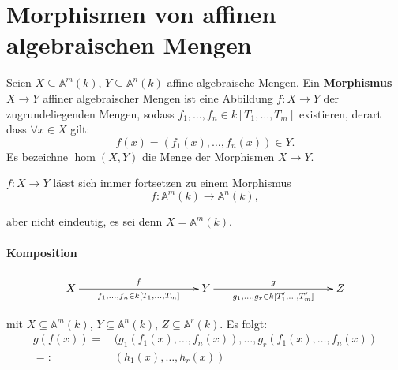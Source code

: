 
\section{Morphismen von affinen algebraischen Mengen}
\label{sec:morphismen-alg-mengen}
\begin{defn}
  \label{def:morphismus-alg-mengen}
  Seien $X\subseteq\mathbb{A}^{m}(k)$, $Y\subseteq\mathbb{A}^{n}(k)$
  affine algebraische Mengen. Ein \textbf{Morphismus} $X\rightarrow Y$
  affiner algebraischer Mengen ist eine Abbildung $f:X\rightarrow Y$
  der zugrundeliegenden Mengen, sodass $f_{1},\ldots,f_{n}\in k[T_{1},\ldots,T_{m}]$
  existieren, derart dass $\forall x\in X$ gilt:
  \[
    f(x)=(f_{1}(x),\ldots,f_{n}(x)) \in Y.
  \]
  Es bezeichne $\hom(X,Y)$ die Menge der Morphismen $X \to Y$. 
\end{defn}
\begin{rem}
  \label{rem:morphismen-fortsetzbarkeit}
  $f:X\rightarrow Y$ lässt sich immer fortsetzen zu einem Morphismus
  \[
    f:\mathbb{A}^{m}(k)\rightarrow\mathbb{A}^{n}(k),
  \]

  aber nicht eindeutig, es sei denn $X=\mathbb{A}^{m}(k)$.
\end{rem}

\paragraph{Komposition}

\[
  \xymatrix@C=9pc{X\ar[r]^{f}_{f_{1},\ldots,f_{n}\in k[T_{1},\ldots,T_{m}]} & Y\ar[r]^{g}_{g_{1},\ldots,g_{r}\in k[T_{1}',\ldots,T_{m}']} & Z}
\]

mit $X\subseteq\mathbb{A}^{m}(k)$, $Y\subseteq\mathbb{A}^{n}(k)$,
$Z\subseteq\mathbb{A}^{r}(k)$. Es folgt:
\begin{align*}
  g(f(x))=\, & (g_{1}(f_{1}(x),\ldots,f_{n}(x)),\ldots,g_{r}(f_{1}(x),\ldots,f_{n}(x))\\
  =:\, & (h_{1}(x),\ldots,h_{r}(x))
\end{align*}

